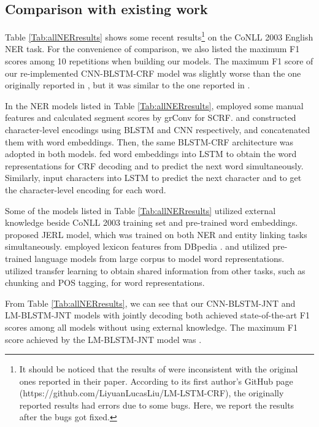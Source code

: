 \documentclass[11pt,a4paper]{article}
\begin{document}
\subsection{Comparison with existing work}
Table \ref{Tab:allNERresults} shows some recent results\footnote{It should be noticed that the results of \citet{liu2017empower} were inconsistent with
the original ones reported in their paper. According to its first author's GitHub page (https://github.com/LiyuanLucasLiu/LM-LSTM-CRF), the originally reported results had errors due to some bugs. Here, we report the results after the bugs got fixed.} on the CoNLL 2003 English NER task.
For the convenience of comparison, we also listed the maximum F1 scores among 10 repetitions when building our models.
The maximum F1 score of our re-implemented CNN-BLSTM-CRF model was slightly worse than the one originally reported in \citet{ma2016end},
but it was similar to the one reported in \citet{Nils2017Reporting}.



In the NER models listed in Table \ref{Tab:allNERresults}, \citet{zhuo2016segment} employed some manual features and calculated segment scores by grConv for SCRF. \citet{lample2016neural} and \citet{ma2016end} constructed character-level encodings using BLSTM and CNN respectively, and concatenated them with word embeddings.
Then, the same BLSTM-CRF architecture was adopted in both models.
\citet{rei2017semi} fed word embeddings into LSTM to obtain the word representations for CRF decoding and to predict the next word simultaneously.
Similarly, \citet{liu2017empower} input characters into LSTM to predict the next character and to get the character-level encoding for each word.

Some of the models listed in Table \ref{Tab:allNERresults} utilized external knowledge beside CoNLL 2003 training set and pre-trained word embeddings.
\citet{luo2015joint} proposed JERL model, which was trained on both NER and entity linking tasks simultaneously.
\citet{chiu2015named} employed lexicon features from DBpedia \cite{auer2007dbpedia}.
\citet{tran2017named} and \citet{peters2017semi} utilized pre-trained language models from large corpus to model word representations.
\citet{yang2017transfer} utilized transfer learning to obtain shared information from other tasks, such as chunking and POS tagging, for word representations.





From Table \ref{Tab:allNERresults}, we can see that our CNN-BLSTM-JNT and LM-BLSTM-JNT models with jointly decoding both achieved state-of-the-art
F1 scores among all models without using external knowledge.
The maximum F1 score achieved by the  LM-BLSTM-JNT model was .
\end{document}
